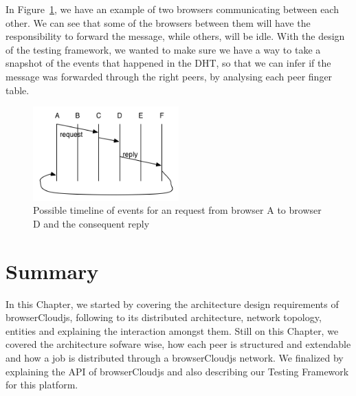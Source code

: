 In Figure~\ref{fig:t-f-2}, we have an example of two browsers communicating between each other. We can see that some of the browsers between them will have the responsibility to forward the message, while others, will be idle. With the design of the testing framework, we wanted to make sure we have a way to take a snapshot of the events that happened in the DHT, so that we can infer if the message was forwarded through the right peers, by analysing each peer finger table.

\begin{figure}[h!]
  \centering
  \includegraphics[width=0.5\textwidth]{figs/testing-framework-2}
  \caption{Possible timeline of events for an request from browser A to browser D and the consequent reply}
  \label{fig:t-f-2}
\end{figure}

\section{Summary}

In this Chapter, we started by covering the architecture design requirements of browserCloudjs, following to its distributed architecture, network topology, entities and explaining the interaction amongst them. Still on this Chapter, we covered the architecture sofware wise, how each peer is structured and extendable and how a job is distributed through a browserCloudjs network. We finalized by explaining the API of browserCloudjs and also describing our Testing Framework for this platform.
